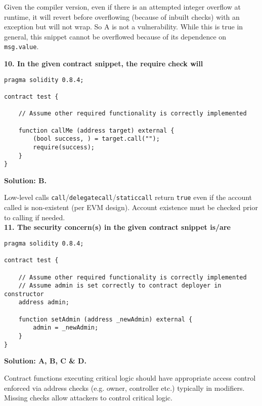Given the compiler version, even if there is an attempted integer overflow at runtime, it will revert before overflowing (because of inbuilt checks) with an exception but will not wrap.
So A is not a vulnerability.
While this is true in general, this snippet cannot be overflowed because of its dependence on \verb|msg.value|.\\

\pagebreak

\textbf{10. In the given contract snippet, the require check will}\label{sec:exam4_q10}\\

\begin{lstlisting}[language=Solidity, style=solStyle]
pragma solidity 0.8.4;

contract test {

    // Assume other required functionality is correctly implemented

    function callMe (address target) external {
        (bool success, ) = target.call("");
        require(success);
    }
}
\end{lstlisting}

\textbf{Solution: B.}

Low-level calls \verb|call|/\verb|delegatecall|/\verb|staticcall| return \verb|true| even if the account called is non-existent (per EVM design).
Account existence must be checked prior to calling if needed.\\

\textbf{11. The security concern(s) in the given contract snippet is/are}\label{sec:exam4_q11}\\

\begin{lstlisting}[language=Solidity, style=solStyle]
pragma solidity 0.8.4;

contract test {

    // Assume other required functionality is correctly implemented
    // Assume admin is set correctly to contract deployer in constructor
    address admin;

    function setAdmin (address _newAdmin) external {
        admin = _newAdmin;
    }
}
\end{lstlisting}

\textbf{Solution: A, B, C \& D.}

Contract functions executing critical logic should have appropriate access control enforced via address checks (e.g. owner, controller etc.) typically in modifiers.
Missing checks allow attackers to control critical logic.\\

